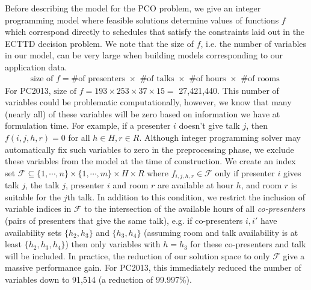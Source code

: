 \documentclass{svjour3}                     %
\begin{document}
Before describing the model for the PCO problem, we give an integer programming model where feasible solutions determine values of functions $f$ which correspond directly to schedules that satisfy the constraints laid out in the ECTTD decision problem.
We note that the size of $f$, i.e. the number of variables in our model, can be very large when building models corresponding to our application data.
\begin{gather*}
	\text{size of } f = \text{\# of presenters } \times \text{ \# of talks } \times \text{ \# of hours } \times \text{ \# of rooms }
\end{gather*}
For PC2013, $\text{size of } f = 193 \times 253 \times 37 \times 15 = $ 27,421,440. 
This number of variables could be problematic computationally, however, we know that many (nearly all) of these variables will be zero based on information we have at formulation time. 
For example, if a presenter $i$ doesn't give talk $j$, then $f(i,j,h,r) = 0$ for all $h \in H, r \in R$. 
Although integer programming solver may automatically fix such variables to zero in the preprocessing phase, we exclude these variables from the model at the time of construction.
We create an index set  $\mathcal F \subseteq \{1,\cdots,n\} \times \{1,\cdots,m\} \times H \times R$ where $f_{i,j,h,r} \in \mathcal F $ only if presenter $i$ gives talk $j$, the talk $j$, presenter $i$ and room $r$ are available at hour $h$, and room $r$ is suitable for the $j$th talk. 
In addition to this condition, we restrict the inclusion of variable indices in $\mathcal F$ to the intersection of the available hours of all \emph{co-presenters} (pairs of presenters that give the same talk), e.g. if co-presenters $i,i'$ have availability sets $\{h_2,h_3\}$ and $\{h_3,h_4\}$ (assuming room and talk availability is at least $\{h_2, h_3, h_4\}$) then only variables with $h=h_3$ for these co-presenters and talk will be included. 
In practice, the reduction of our solution space to only $\mathcal F$ give a massive performance gain. 
For PC2013, this immediately reduced the number of variables down to 91,514 (a reduction of 99.997\%).
\end{document}
